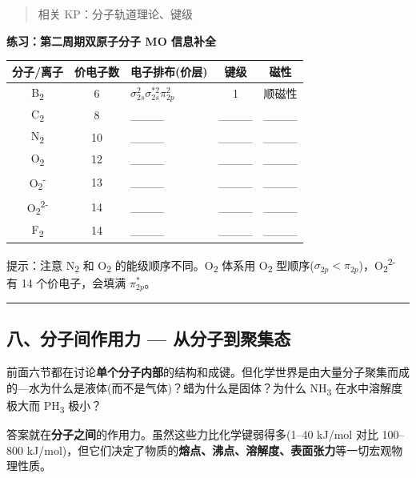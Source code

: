 \begin{quote}
相关 KP：分子轨道理论、键级
\end{quote}

\textbf{练习：第二周期双原子分子 MO 信息补全}

{\def\LTcaptype{none} %
\begin{longtable}[]{@{}cclcc@{}}
\toprule\noalign{}
分子/离子 & 价电子数 & 电子排布(价层) & 键级 & 磁性 \\
\midrule\noalign{}
\endhead
\bottomrule\noalign{}
\endlastfoot
B\textsubscript{2} & 6 & \(\sigma_{2s}^2 \sigma_{2s}^{*2} \pi_{2p}^2\) & 1 & 顺磁性 \\
C\textsubscript{2} & 8 & \_\_\_\_ & \_\_\_\_ & \_\_\_\_ \\
N\textsubscript{2} & 10 & \_\_\_\_ & \_\_\_\_ & \_\_\_\_ \\
O\textsubscript{2} & 12 & \_\_\_\_ & \_\_\_\_ & \_\_\_\_ \\
O\textsubscript{2}\textsuperscript{-} & 13 & \_\_\_\_ & \_\_\_\_ & \_\_\_\_ \\
O\textsubscript{2}\textsuperscript{2-} & 14 & \_\_\_\_ & \_\_\_\_ & \_\_\_\_ \\
F\textsubscript{2} & 14 & \_\_\_\_ & \_\_\_\_ & \_\_\_\_ \\
\end{longtable}
}

提示：注意 N\textsubscript{2} 和 O\textsubscript{2} 的能级顺序不同。O\textsubscript{2} 体系用 O\textsubscript{2} 型顺序(\(\sigma_{2p}<\pi_{2p}\))，O\textsubscript{2}\textsuperscript{2-} 有 14 个价电子，会填满 \(\pi_{2p}^*\)。

\begin{center}\rule{0.5\linewidth}{0.5pt}\end{center}

\subsection{八、分子间作用力 --- 从分子到聚集态}\label{ux516bux5206ux5b50ux95f4ux4f5cux7528ux529b-ux4eceux5206ux5b50ux5230ux805aux96c6ux6001}

前面六节都在讨论\textbf{单个分子内部}的结构和成键。但化学世界是由大量分子聚集而成的---水为什么是液体(而不是气体)？蜡为什么是固体？为什么 NH\textsubscript{3} 在水中溶解度极大而 PH\textsubscript{3} 极小？

答案就在\textbf{分子之间}的作用力。虽然这些力比化学键弱得多(1--40 kJ/mol 对比 100--800 kJ/mol)，但它们决定了物质的\textbf{熔点、沸点、溶解度、表面张力}等一切宏观物理性质。


